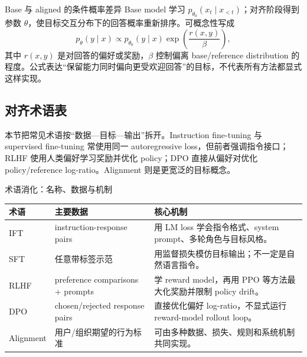 

\begin{importantbox}{Base 与 aligned 的条件概率差异}
Base model 学习 $p_{\theta_0}(x_t\mid x_{<t})$；对齐阶段得到参数 $\theta$，使目标交互分布下的回答概率重新排序。可概念性写成
\[
p_{\theta}(y\mid x)\propto p_{\theta_0}(y\mid x)\exp\!\left(\frac{r(x,y)}{\beta}\right),
\]
其中 $r(x,y)$ 是对回答的偏好或奖励，$\beta$ 控制偏离 base/reference distribution 的程度。公式表达“保留能力同时偏向更受欢迎回答”的目标，不代表所有方法都显式这样实现。
\end{importantbox}


\subsection{对齐术语表}

本节把常见术语按“数据—目标—输出”拆开。Instruction fine-tuning 与 supervised fine-tuning 常使用同一 autoregressive loss，但前者强调指令接口；RLHF 使用人类偏好学习奖励并优化 policy；DPO 直接从偏好对优化 policy/reference log-ratio。Alignment 则是更宽泛的目标概念。


\begin{knowledgebox}{术语消化：名称、数据与机制}
\begin{tabularx}{\textwidth}{L{0.18\textwidth} L{0.24\textwidth} X}
\toprule
术语 & 主要数据 & 核心机制 \\
\midrule
IFT & instruction-response pairs & 用 LM loss 学会指令格式、system prompt、多轮角色与目标风格。 \\
SFT & 任意带标签示范 & 用监督损失模仿目标输出；不一定是自然语言指令。 \\
RLHF & preference comparisons + prompts & 学 reward model，再用 PPO 等方法最大化奖励并限制 policy drift。 \\
DPO & chosen/rejected response pairs & 直接优化偏好 log-ratio，不显式运行 reward-model rollout loop。 \\
Alignment & 用户/组织期望的行为标准 & 可由多种数据、损失、规则和系统机制共同实现。 \\
\bottomrule
\end{tabularx}
\end{knowledgebox}

